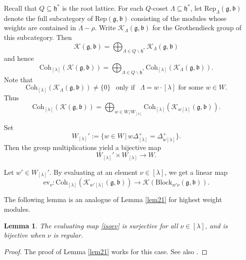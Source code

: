 \documentclass[12pt,a4paper]{amsart}
\def\subset{\subseteq}
\newcommand{\CK}{{\mathcal {K}}}
\newcommand{\g}{\mathfrak g}
\newcommand{\h}{\mathfrak h}
\renewcommand{\b}{\mathfrak b}
\newcommand{\be}{\begin {equation}}
\newcommand{\ee}{\end {equation}}
\numberwithin{equation}{section}
\newtheorem{lem}[thm]{Lemma}
\theoremstyle{remark}
\def\Coh{\mathrm{Coh}}
\newcommand{\Lam}{{[\lambda]}}
\begin{document}

 Recall that $Q\subset \h^*$ is the root lattice.
For each $Q$-coset  $\Lambda\subset \h^*$,
 let $\mathrm{Rep}_{\Lambda}(\g, \b)$ denote the full subcategory of $\mathrm{Rep}(\g, \b)$ consisting of the modules whose weights are contained in $\Lambda-\rho$.
 Write $\CK_{ \Lambda}(\g, \b)$ for the Grothendieck group of this subcategory. Then
 \[
   \CK(\g, \b)=\bigoplus_{\Lambda\in Q\backslash \h^*} \CK_{ \Lambda}(\g, \b)
 \]
 and hence
\[
 \Coh_{\Lam}( \CK(\g,\b))=\bigoplus_{\Lambda\in Q\backslash \h^*}\Coh_{\Lam}(\CK_{ \Lambda}(\g, \b) ).
\]
Note that
\[
  \Coh_{\Lam}(\CK_{ \Lambda}(\g, \b))\neq \{0\} \ \ \textrm{ only if } \ \ \Lambda=w \cdot \Lam \textrm{ for some $w\in W$}.
\]
Thus
\be\label{decLam}
 \Coh_{\Lam}( \CK(\g,\b))=\bigoplus_{w\in W/W_\Lam}\Coh_{\Lam}(\CK_{ w \Lam}(\g, \b) ).
\ee


Set
\[
  W_\Lam':=\{w\in W\,|\,  w\Delta_\Lam^+ = \Delta_{w\Lam}^+\}.
\]
Then the group multiplications yield a bijective map
\[
  W_\Lam'\times W_\Lam\rightarrow W.
\]


Let $w'\in W_\Lam'$. %
By evaluating at an element $\nu\in \Lam$, we get a linear map
\be\label{isoev}
 \mathrm{ev}_\nu:   \Coh_{\Lam}( \CK_{w'\Lam}(\g,\b))\rightarrow \CK(\mathrm{Block}_{w'\nu}(\g, \b)).
\ee

The following lemma is an analogue of Lemma \ref{lem21} for highest weight modules.

\begin{lem}\label{surv}
The evaluating map \eqref{isoev} is surjective for all $\nu\in \Lam$, and  is bijective when $\nu$ is regular.
\end{lem}
\begin{proof}
The proof of Lemma \ref{lem21} works for this case. See also \cite[Theorem 7.7]{Mil}.
\end{proof}
\end{document}
